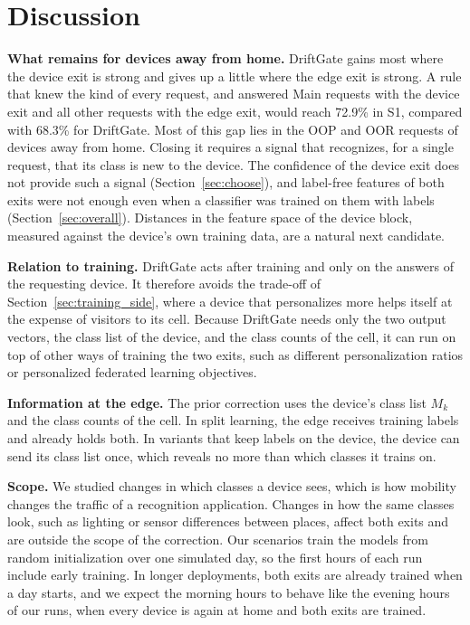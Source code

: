 \section{Discussion}
\label{sec:discussion}

\textbf{What remains for devices away from home.} DriftGate gains most where the device exit is strong and gives up a little where the edge exit is strong. A rule that knew the kind of every request, and answered Main requests with the device exit and all other requests with the edge exit, would reach 72.9\% in S1, compared with 68.3\% for DriftGate. Most of this gap lies in the OOP and OOR requests of devices away from home. Closing it requires a signal that recognizes, for a single request, that its class is new to the device. The confidence of the device exit does not provide such a signal (Section~\ref{sec:choose}), and label-free features of both exits were not enough even when a classifier was trained on them with labels (Section~\ref{sec:overall}). Distances in the feature space of the device block, measured against the device's own training data, are a natural next candidate.

\textbf{Relation to training.} DriftGate acts after training and only on the answers of the requesting device. It therefore avoids the trade-off of Section~\ref{sec:training_side}, where a device that personalizes more helps itself at the expense of visitors to its cell. Because DriftGate needs only the two output vectors, the class list of the device, and the class counts of the cell, it can run on top of other ways of training the two exits, such as different personalization ratios or personalized federated learning objectives.

\textbf{Information at the edge.} The prior correction uses the device's class list $M_k$ and the class counts of the cell. In split learning, the edge receives training labels and already holds both. In variants that keep labels on the device, the device can send its class list once, which reveals no more than which classes it trains on.

\textbf{Scope.} We studied changes in which classes a device sees, which is how mobility changes the traffic of a recognition application. Changes in how the same classes look, such as lighting or sensor differences between places, affect both exits and are outside the scope of the correction. Our scenarios train the models from random initialization over one simulated day, so the first hours of each run include early training. In longer deployments, both exits are already trained when a day starts, and we expect the morning hours to behave like the evening hours of our runs, when every device is again at home and both exits are trained.
